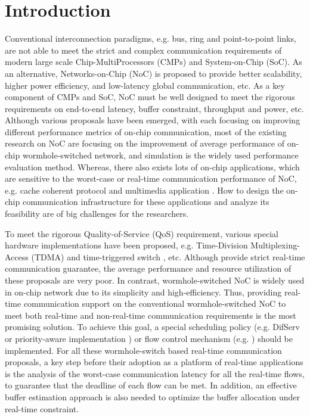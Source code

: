 \documentclass[10pt,journal]{IEEEtran}
\begin{document}
\section{Introduction}
Conventional interconnection paradigms, e.g. bus, ring and point-to-point links, are not able to meet the strict and complex communication requirements of modern large scale Chip-MultiProcessors (CMPs) and System-on-Chip (SoC). As an alternative, Networks-on-Chip (NoC) is proposed to provide better scalability, higher power efficiency, and low-latency global communication, etc. As a key component of CMPs and SoC, NoC must be well designed to meet the rigorous requirements on end-to-end latency, buffer constraint, throughput and power, etc. Although various proposals have been emerged, with each focusing on improving different performance metrics of on-chip communication, most of the existing research on NoC are focusing on the improvement of average performance of on-chip wormhole-switched network, and simulation is the widely used performance evaluation method. Whereas, there also exists lots of on-chip applications, which are sensitive to the worst-case or real-time communication performance of NoC, e.g. cache coherent protocol \cite{Bolotin2007}\cite{5951888} and multimedia application \cite{ostermann2004video}. How to design the on-chip communication infrastructure for these applications and analyze its feasibility are of big challenges for the researchers.

To meet the rigorous Quality-of-Service (QoS) requirement, various special hardware implementations have been proposed, e.g. Time-Division Multiplexing-Access (TDMA) \cite{GoDR05} and time-triggered switch \cite{4617280}, etc. Although provide strict real-time communication guarantee, the average performance and resource utilization of these proposals are very poor. In contrast, wormhole-switched NoC is widely used in on-chip network due to its simplicity and high-efficiency. Thus, providing real-time communication support on the conventional wormhole-switched NoC to meet both real-time and non-real-time communication requirements is the most promising solution. To achieve this goal, a special scheduling policy (e.g. DifServ \cite{1411140} or priority-aware implementation \cite{Shi:2008:RCA:1397757.1397996}\cite{708526}\cite{627905}) or flow control mechanism (e.g. \cite{Li199649}\cite{707545}) should be implemented. For all these wormhole-switch based real-time communication proposals, a key step before their adoption as a platform of real-time applications is the analysis of the worst-case communication latency for all the real-time flows, to guarantee that the deadline of each flow can be met. In addition, an effective buffer estimation approach is also needed to optimize the buffer allocation under real-time constraint.
\end{document}
